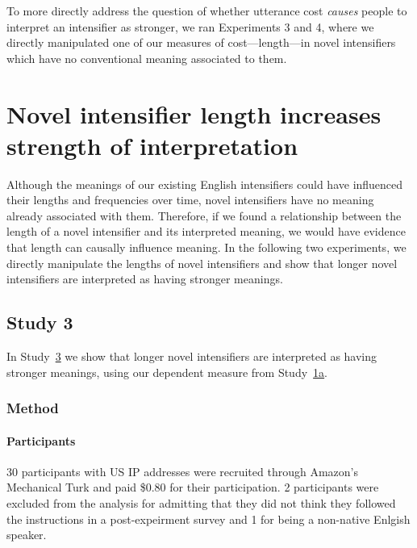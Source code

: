 \documentclass[10pt,letterpaper]{article}
\begin{document}
To more directly address the question of whether utterance cost \emph{causes} people to interpret an intensifier as stronger, we ran Experiments 3 and 4, where we directly manipulated one of our measures of cost---length---in novel intensifiers which have no conventional meaning associated to them.

\section{Novel intensifier length increases strength of interpretation}

Although the meanings of our existing English intensifiers could have influenced their lengths and frequencies over time, novel intensifiers have no meaning already associated with them. Therefore, if we found a relationship between the length of a novel intensifier and its interpreted meaning, we would have evidence that length can causally influence meaning. In the following two experiments, we directly manipulate the lengths of novel intensifiers and show that longer novel intensifiers are interpreted as having stronger meanings.

\subsection{Study 3 \label{sec:study3}}


In Study~\hyperref[sec:study3]{3} we show that longer novel intensifiers are interpreted as having stronger meanings, using our dependent measure from Study~\hyperref[sec:study1a]{1a}.

\subsubsection{Method}

\paragraph{Participants}

30 participants with US IP addresses were recruited through Amazon's Mechanical Turk and paid \$0.80 for their participation. 2 participants were excluded from the analysis for admitting that they did not think they followed the instructions in a post-expeirment survey and 1 for being a non-native Enlgish speaker.
\end{document}
